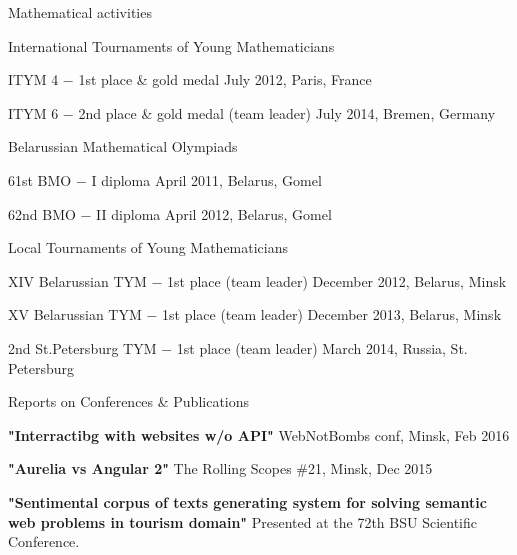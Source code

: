 \documentclass{resume} %
\begin{document}
\begin{rSection}{Mathematical activities}

\begin{rSubsection}{International Tournaments of Young Mathematicians}{}{}

\item ITYM 4 $-$ 1st place \& gold medal \hfill July 2012, Paris, France
\item ITYM 6 $-$ 2nd place \& gold medal (team leader) \hfill July 2014, Bremen, Germany

\end{rSubsection}

\begin{rSubsection}{Belarussian Mathematical Olympiads}{}{}

\item 61st BMO $-$ I diploma \hfill  April 2011, Belarus, Gomel
\item 62nd BMO $-$ II diploma \hfill April 2012, Belarus, Gomel
\end{rSubsection}


\begin{rSubsection}{Local Tournaments of Young Mathematicians}{}{}

\item XIV Belarussian TYM $-$ 1st place (team leader) \hfill December 2012, Belarus, Minsk
\item XV Belarussian TYM $-$ 1st place (team leader) \hfill December 2013, Belarus, Minsk
\item 2nd St.Petersburg TYM $-$ 1st place (team leader) \hfill March 2014, Russia, St. Petersburg
\end{rSubsection}

\end{rSection}

\begin{rSection}{Reports on Conferences & Publications}

{\bf "Interractibg with websites w/o API"} WebNotBombs conf, Minsk, Feb 2016

{\bf "Aurelia vs Angular 2"} The Rolling Scopes \#21, Minsk, Dec 2015

{\bf "Sentimental corpus of texts generating system for solving semantic web problems in tourism domain"}
Presented at the 72th BSU Scientific Conference.

\end{rSection}






\end{document}
